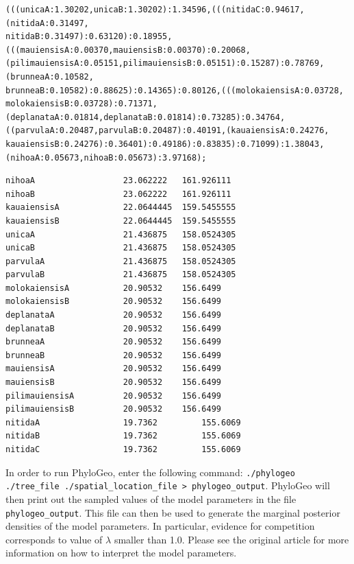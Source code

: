 \documentclass[a4paper,12pt]{article}
\newcommand{\x}[1]{\texttt{#1}}
\begin{document}
\begin{scriptsize}
\begin{Verbatim}[frame=single, label=Valid PhyloGeo input tree, samepage=true, baselinestretch=0.5]
(((unicaA:1.30202,unicaB:1.30202):1.34596,(((nitidaC:0.94617,(nitidaA:0.31497,
nitidaB:0.31497):0.63120):0.18955,(((mauiensisA:0.00370,mauiensisB:0.00370):0.20068,
(pilimauiensisA:0.05151,pilimauiensisB:0.05151):0.15287):0.78769,(brunneaA:0.10582,
brunneaB:0.10582):0.88625):0.14365):0.80126,(((molokaiensisA:0.03728,
molokaiensisB:0.03728):0.71371,(deplanataA:0.01814,deplanataB:0.01814):0.73285):0.34764,
((parvulaA:0.20487,parvulaB:0.20487):0.40191,(kauaiensisA:0.24276,
kauaiensisB:0.24276):0.36401):0.49186):0.83835):0.71099):1.38043,
(nihoaA:0.05673,nihoaB:0.05673):3.97168);
\end{Verbatim}

\begin{Verbatim}[frame=single, label=Valid PhyloGeo spatial location file, samepage=true, baselinestretch=0.5]
nihoaA                  23.062222	161.926111
nihoaB                  23.062222	161.926111
kauaiensisA             22.0644445	159.5455555
kauaiensisB             22.0644445	159.5455555
unicaA                  21.436875	158.0524305
unicaB                  21.436875	158.0524305
parvulaA                21.436875	158.0524305
parvulaB                21.436875	158.0524305
molokaiensisA           20.90532	156.6499
molokaiensisB           20.90532	156.6499
deplanataA              20.90532	156.6499
deplanataB              20.90532	156.6499
brunneaA                20.90532	156.6499
brunneaB                20.90532	156.6499
mauiensisA              20.90532	156.6499
mauiensisB              20.90532	156.6499
pilimauiensisA          20.90532	156.6499
pilimauiensisB          20.90532	156.6499
nitidaA                 19.7362	        155.6069
nitidaB                 19.7362	        155.6069
nitidaC                 19.7362	        155.6069
\end{Verbatim}
\end{scriptsize}

In order to run PhyloGeo, enter the following command: \x{./phylogeo ./tree\_file
  ./spatial\_location\_file > phylogeo\_output}.
PhyloGeo will then print out the sampled values of the model parameters in the file
\x{phylogeo\_output}. This file can then be used to generate the marginal posterior densities of the
model parameters. In particular, evidence for competition corresponds to value of $\lambda$ smaller
than 1.0. Please see the original article for more information on how to interpret the model
parameters.
\end{document}

